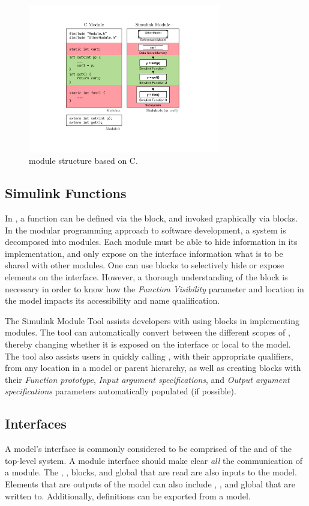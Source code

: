 \documentclass{article}
\makeatletter
\newcommand{\ToolName}{Simulink Module Tool\@\xspace}
\makeatother
\begin{document}
\begin{figure}
	\centering
	\includegraphics[width=0.75\textwidth]{../figs/Module}
	\caption{\Simulink module structure based on C.}
	\label{FIG:module}
\end{figure}

\subsection{Simulink Functions}
In \Simulink, a function can be defined via the \simfunc block, and invoked graphically via \simfunccaller blocks. In the modular programming approach to software development, a system is decomposed into modules. Each module must be able to hide information in its implementation, and only expose on the interface information what is to be shared with other modules. One can use \simfunc blocks to selectively hide or expose elements on the interface. However, a thorough understanding of the \simfunc block is necessary in order to know how the \emph{Function Visibility} parameter and location in the model impacts its accessibility and name qualification. 

The \ToolName assists developers with using \simfunc blocks in implementing \Simulink modules. The tool can automatically convert between the different scopes of , thereby changing whether it is exposed on the interface or local to the model. The tool also assists users in quickly calling , with their appropriate qualifiers, from any location in a model or parent hierarchy, as well as creating \simfunccaller blocks with their \emph{Function prototype}, \emph{Input argument specifications}, and \emph{Output argument specifications} parameters automatically populated (if possible).

\subsection{Interfaces}
A \Simulink model's interface is commonly considered to be comprised of the  and  of the top-level system. A module interface should make clear \emph{all} the communication of a module. The \fromfile, \fromspreadsheet, \fromworkspace blocks, and global  that are read are also inputs to the model. Elements that are outputs of the model can also include \toworkspace, \tofile, and global  that are written to. Additionally, \simfunc definitions can be exported from a model. %
\end{document}
